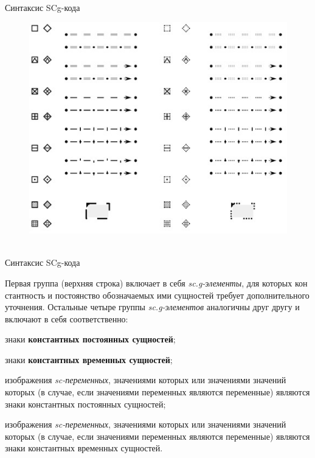 \begin{frame}{\\Синтаксис SCg-кода}
	\topline
		\justifying
	\vspace*{\fill}
	\begin{figure}[H]
		\includegraphics[scale=0.6]{./figures/external_langs/alphabet_scg_code_part2.png}
	\end{figure}
\end{frame}

\begin{frame}{\\Синтаксис SCg-кода}
	\topline
	\justifying
	\vspace*{\fill}\\
	\small{Первая группа (верхняя строка) включает в себя \textit{sc.g-элементы}, для которых кон стантность и постоянство обозначаемых ими сущностей требует дополнительного уточнения. Остальные четыре группы \textit{sc.g-элементов} аналогичны друг другу и включают в себя соответственно:
	\begin{textitemize}
		\item знаки \textbf{константных постоянных сущностей};
		\item знаки \textbf{константных временных сущностей};
		\item изображения \textit{sc-переменных}, значениями которых или значениями значений которых (в случае, если значениями переменных являются переменные) являются знаки константных постоянных сущностей;
		\item изображения \textit{sc-переменных}, значениями которых или значениями значений которых (в случае, если значениями переменных являются переменные) являются знаки константных временных сущностей.
	\end{textitemize}}
\end{frame}

